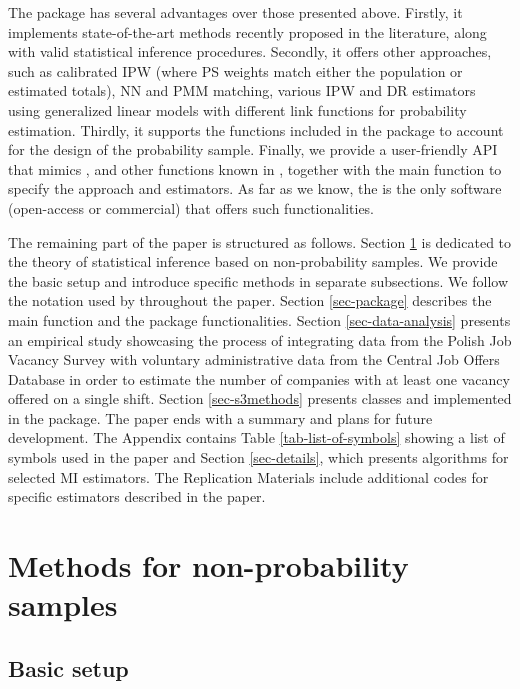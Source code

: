 \documentclass[
]{jss}
\begin{document}
The  package has several advantages over those presented
above. Firstly, it implements state-of-the-art methods recently proposed
in the literature, along with valid statistical inference procedures.
Secondly, it offers other approaches, such as calibrated IPW (where PS
weights match either the population or estimated totals), NN and PMM
matching, various IPW and DR estimators using generalized linear models
with different link functions for probability estimation. Thirdly, it
supports the functions included in the  package to account
for the design of the probability sample. Finally, we provide a
user-friendly API that mimics ,  and
other functions known in , together with the main function
to specify the approach and estimators. As far as we know, the
 is the only software (open-access or commercial) that
offers such functionalities.

The remaining part of the paper is structured as follows. Section
\ref{sec-methods} is dedicated to the theory of statistical inference
based on non-probability samples. We provide the basic setup and
introduce specific methods in separate subsections. We follow the
notation used by \citet{wu2022statistical} throughout the paper. Section
\ref{sec-package} describes the main function and the package
functionalities. Section \ref{sec-data-analysis} presents an empirical
study showcasing the process of integrating data from the Polish Job
Vacancy Survey with voluntary administrative data from the Central Job
Offers Database in order to estimate the number of companies with at
least one vacancy offered on a single shift. Section \ref{sec-s3methods}
presents classes and  implemented in the package. The
paper ends with a summary and plans for future development. The Appendix
contains Table \ref{tab-list-of-symbols} showing a list of symbols used
in the paper and Section \ref{sec-details}, which presents algorithms
for selected MI estimators. The Replication Materials include additional
codes for specific estimators described in the paper.

\section{Methods for non-probability samples}\label{sec-methods}

\subsection{Basic setup}\label{basic-setup}
\end{document}
